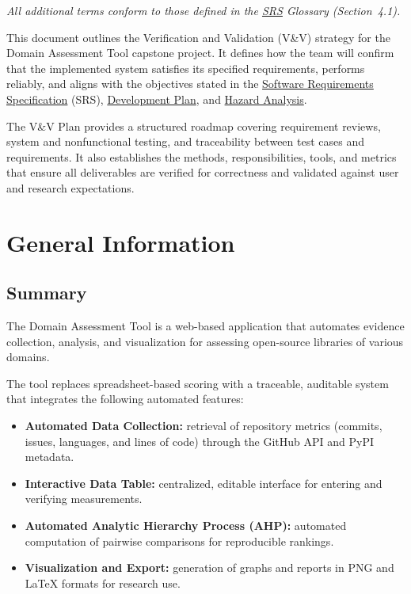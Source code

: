 \documentclass[12pt, titlepage]{article}
\begin{document}
\noindent\textit{All additional terms conform to those defined in the \href{https://github.com/thaafei/DomainX/blob/main/docs/SRS/SRS.pdf}{SRS} Glossary (Section~4.1).}
\newpage


This document outlines the Verification and Validation (V\&V) strategy for the
Domain Assessment Tool capstone project. It defines how
the team will confirm that the implemented system satisfies its specified
requirements, performs reliably, and aligns with the objectives stated in the
\href{https://github.com/thaafei/DomainX/blob/main/docs/SRS/SRS.pdf}{Software Requirements Specification} (SRS), \href{https://github.com/thaafei/DomainX/blob/main/docs/DevelopmentPlan/DevelopmentPlan.pdf}{Development Plan}, and \href{https://github.com/thaafei/DomainX/blob/main/docs/HazardAnalysis/HazardAnalysis.pdf}{Hazard
Analysis}.

The V\&V Plan provides a structured roadmap covering requirement reviews,
system and nonfunctional testing, and traceability between test cases and
requirements. It also establishes the methods, responsibilities, tools, and
metrics that ensure all deliverables are verified for correctness and validated
against user and research expectations.

\section{General Information}
\label{sec:general-info}
\subsection{Summary}
\label{subsec:summary}
The Domain Assessment Tool is a web-based application
that automates evidence collection, analysis, and visualization for assessing
open-source libraries of various domains.

The tool replaces spreadsheet-based scoring with a traceable, auditable system
that integrates the following automated features:

\begin{itemize}
  \item \textbf{Automated Data Collection:} retrieval of repository metrics
  (commits, issues, languages, and lines of code) through the GitHub API and
  PyPI metadata.

  \item \textbf{Interactive Data Table:} centralized, editable interface for
  entering and verifying measurements.

  \item \textbf{Automated Analytic Hierarchy Process (AHP):} automated
  computation of pairwise comparisons for reproducible rankings.

  \item \textbf{Visualization and Export:} generation of graphs and reports in
  PNG and \LaTeX{} formats for research use.
\end{itemize}
\end{document}
